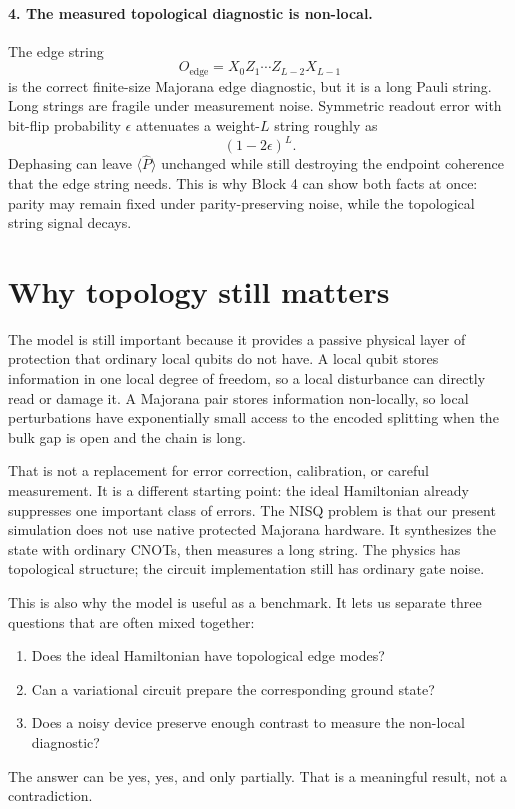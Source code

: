 \documentclass[11pt]{article}
\newcommand{\Pop}{\hat{P}}
\newcommand{\Oedge}{X_0 Z_1\cdots Z_{L-2} X_{L-1}}
\newcommand{\expv}[1]{\langle #1\rangle}
\begin{document}
\paragraph{4. The measured topological diagnostic is non-local.}
The edge string
\begin{equation}
  O_{\mathrm{edge}}=\Oedge
\end{equation}
is the correct finite-size Majorana edge diagnostic, but it is a long Pauli
string. Long strings are fragile under measurement noise. Symmetric readout error
with bit-flip probability $\epsilon$ attenuates a weight-$L$ string roughly as
\begin{equation}
  (1-2\epsilon)^L .
\end{equation}
Dephasing can leave $\expv{\Pop}$ unchanged while still destroying the endpoint
coherence that the edge string needs. This is why Block 4 can show both facts at
once: parity may remain fixed under parity-preserving noise, while the
topological string signal decays.

\section{Why topology still matters}

The model is still important because it provides a passive physical layer of
protection that ordinary local qubits do not have. A local qubit stores
information in one local degree of freedom, so a local disturbance can directly
read or damage it. A Majorana pair stores information non-locally, so local
perturbations have exponentially small access to the encoded splitting when the
bulk gap is open and the chain is long.

That is not a replacement for error correction, calibration, or careful
measurement. It is a different starting point: the ideal Hamiltonian already
suppresses one important class of errors. The NISQ problem is that our present
simulation does not use native protected Majorana hardware. It synthesizes the
state with ordinary CNOTs, then measures a long string. The physics has
topological structure; the circuit implementation still has ordinary gate noise.

This is also why the model is useful as a benchmark. It lets us separate three
questions that are often mixed together:
\begin{enumerate}
  \item Does the ideal Hamiltonian have topological edge modes?
  \item Can a variational circuit prepare the corresponding ground state?
  \item Does a noisy device preserve enough contrast to measure the non-local
  diagnostic?
\end{enumerate}
The answer can be yes, yes, and only partially. That is a meaningful result, not
a contradiction.
\end{document}
